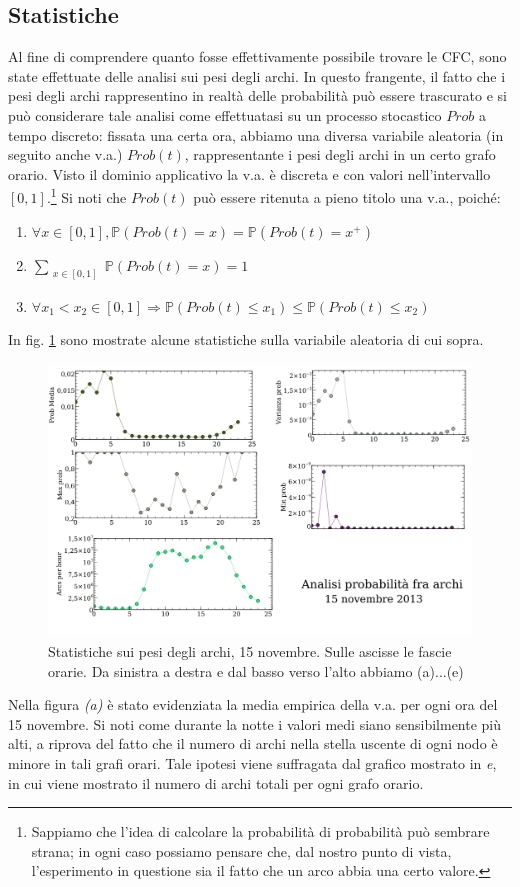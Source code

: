 \documentclass[10pt,a4paper]{article}
\begin{document}
\subsection{Statistiche}
Al fine di comprendere quanto fosse effettivamente possibile trovare le CFC, sono state effettuate delle analisi sui pesi degli archi. In questo frangente, il fatto che i pesi degli archi rappresentino in realtà delle probabilità può essere trascurato e si può considerare tale analisi come effettuatasi su un processo stocastico $Prob$ a tempo discreto: fissata una certa ora, abbiamo una diversa variabile aleatoria (in seguito anche v.a.) $Prob(t)$, rappresentante i pesi degli archi in un certo grafo orario. Visto il dominio applicativo la v.a. è discreta e con valori nell'intervallo $[0,1]$.\footnote{Sappiamo che l'idea di calcolare la probabilità di probabilità può sembrare strana; in ogni caso possiamo pensare che, dal nostro punto di vista, l'esperimento in questione sia il fatto che un arco abbia una certo valore.}
Si noti che $Prob(t)$ può essere ritenuta a pieno titolo una v.a., poiché:
\begin{enumerate}
\item $\forall x \in [0,1], \mathbb{P}(Prob(t) = x) = \mathbb{P}(Prob(t) = x^+)$
\item $\sum_{\substack{x \in [0,1]}}{ \mathbb{P}(Prob(t) = x)} = 1$
\item $\forall x_1 < x_2 \in [0,1] \Rightarrow \mathbb{P}(Prob(t) \leq x_1) \leq \mathbb{P}(Prob(t) \leq x_2)$ 
\end{enumerate}
In fig. \ref{img:probs} sono mostrate alcune statistiche sulla variabile aleatoria di cui sopra.
\begin{figure}
 \includegraphics[scale=.6]{img/probs15nov.png}
 \caption{Statistiche sui pesi degli archi, 15 novembre. Sulle ascisse le fascie orarie. Da sinistra a destra e dal basso verso l'alto abbiamo (a)...(e)}
 \label{img:probs}
\end{figure}
Nella figura \emph{(a)} è stato evidenziata la media empirica della v.a. per ogni ora del 15 novembre. Si noti come durante la notte i valori medi siano sensibilmente più alti, a riprova del fatto che il numero di archi nella stella uscente di ogni nodo è minore in tali grafi orari. Tale ipotesi viene suffragata dal grafico mostrato in \emph{e}, in cui viene mostrato il numero di archi totali per ogni grafo orario. 
\end{document}
